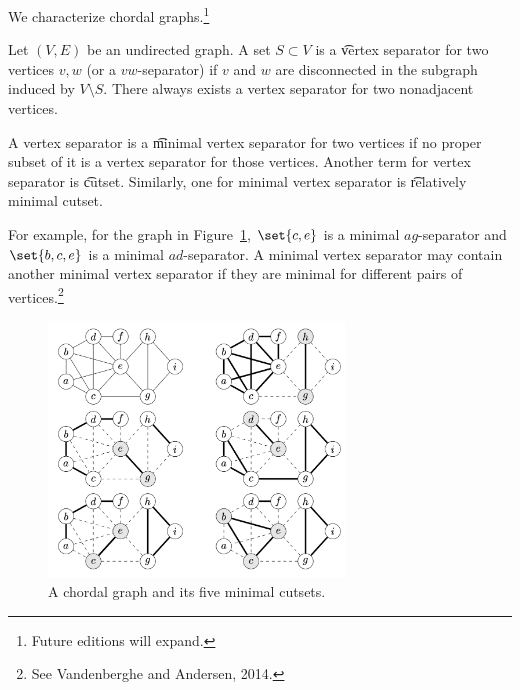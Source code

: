 

We characterize chordal graphs.\footnote{Future editions will expand.}


Let $(V, E)$ be an undirected graph.
A set $S \subset V$ is a \t{vertex separator} for two vertices $v, w$ (or a \t{$vw$-separator}) if $v$ and $w$ are disconnected in the subgraph induced by $V \setminus S$.
There always exists a vertex separator for two nonadjacent vertices.

A vertex separator is a \t{minimal vertex separator} for two vertices if no proper subset of it is a vertex separator for those vertices.
Another term for vertex separator is \t{cutset}.
Similarly, one for minimal vertex separator is \t{relatively minimal cutset}.


For example, for the graph in Figure~\ref{figure:vertex_separators:cutsets}, $\set{c,e}$ is a minimal $ag$-separator and $\set{b,c,e}$ is a minimal $ad$-separator.
A minimal vertex separator may contain another minimal vertex separator if they are minimal for different pairs of vertices.\footnote{See Vandenberghe and Andersen, 2014.}

\begin{figure}
  \centering
  \includegraphics[width=0.7\textwidth]{graphics_included/cutsets}
  \caption{A chordal graph and its five minimal cutsets.}
  \label{figure:vertex_separators:cutsets}
\end{figure}


